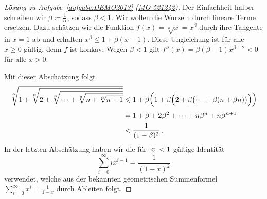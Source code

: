 \begin{proof}[Lösung zu Aufgabe~\ref{aufgabe:DEMO2013} \textmd{(\href{https://www.mathematik-olympiaden.de/moev/index.php?option=com_download&thema=a&format=raw&datei=A52124a.pdf}{MO 521242})}]
	Der Einfachheit halber schreiben wir $\beta\coloneqq \frac 1\alpha$, sodass $\beta<1$. Wir wollen die Wurzeln durch lineare Terme ersetzen. Dazu schätzen wir die Funktion $f(x)=\sqrt[\alpha]{x}=x^\beta$ durch ihre Tangente in $x=1$ ab und erhalten $x^\beta\leqslant 1+\beta(x-1)$. Diese Ungleichung ist für alle $x\geqslant 0$ gültig, denn $f$ ist konkav: Wegen $\beta<1$ gilt $f''(x)=\beta(\beta-1)x^{\beta-2}<0$ für alle $x>0$.
	
	Mit dieser Abschätzung folgt
	\begin{align*}
		\sqrt[\alpha]{1+\sqrt[\alpha]{2+\sqrt[\alpha]{\dotsb+\sqrt[\alpha]{n+\sqrt[\alpha]{n+1}}}}}&\leqslant 1+\beta\parens[\bigg]{1+\beta\parens[\Big]{2+\beta\parens[\big]{\dotsb+\beta(n+\beta n)}}}\\
		&=1+\beta+2\beta^2+\dotsb+n\beta^n+n\beta^{n+1}\\
		&<\frac1{(1-\beta)^2}\,.
	\end{align*}
	In der letzten Abschätzung haben wir die für $\abs{x}<1$ gültige Identität
	\begin{equation*}
		\sum_{i=0}^\infty ix^{i-1}=\frac1{(1-x)^2}
	\end{equation*}
	verwendet, welche aus der bekannten geometrischen Summenformel $\sum_{i=0}^\infty x^i=\frac1{1-x}$ durch Ableiten folgt.
\end{proof}